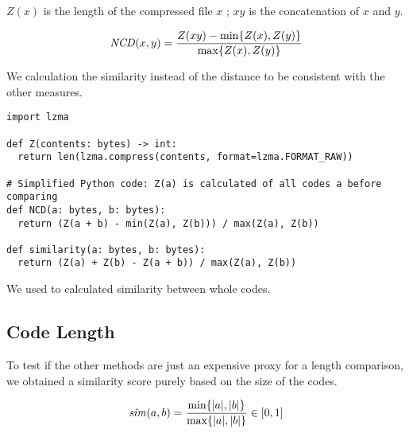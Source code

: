\documentclass[../main.tex]{subfiles}
\begin{document}
$Z(x)$ is the length of the compressed file $x$ ; $xy$ is the concatenation of $x$ and $y$.

\begin{equation}
  \mbox{\textit{NCD}}(x,y) = \dfrac{Z(xy) - \min\{Z(x), Z(y)\}}{\max \{Z(x), Z(y)\}}
\end{equation}

We calculation the similarity instead of the distance to be consistent with the other measures.

\begin{lstlisting}[style=pymd]
import lzma

def Z(contents: bytes) -> int:
  return len(lzma.compress(contents, format=lzma.FORMAT_RAW))

# Simplified Python code: Z(a) is calculated of all codes a before comparing
def NCD(a: bytes, b: bytes):
  return (Z(a + b) - min(Z(a), Z(b))) / max(Z(a), Z(b))

def similarity(a: bytes, b: bytes):
  return (Z(a) + Z(b) - Z(a + b)) / max(Z(a), Z(b))
\end{lstlisting}

We used  to calculated similarity between whole codes.

\subsection{Code Length \label{sec:size}}

To test if the other methods are just an expensive proxy for a length comparison, we obtained a similarity score purely based on the size of the codes.

\begin{equation}
  \mbox{\textit{sim}}(a, b) = \dfrac{\min\{|a|,|b|\}}{\max\{|a|,|b|\}} \in [0,1]
  \label{eq:size}
\end{equation}
\end{document}
